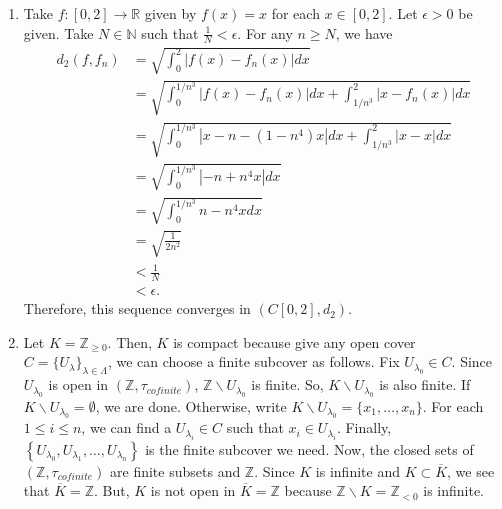 \documentclass{article}
\newcommand{\R}{\mathbb{R}}
\newcommand{\N}{\mathbb{N}}
\newcommand{\Z}{\mathbb{Z}}
\begin{document}
\begin{enumerate}[label=\roman*)]

\item Take $f:[0,2]\to \R$ given by $f(x)=x$ for each $x\in [0,2]$.
Let $\epsilon>0$ be given. Take $N\in\N$ such that $\frac{1}{N}<\epsilon$. 
For any $n\geq N$, we have 
\begin{align*}
    d_2(f,f_n) &= \sqrt{ \int_0^2 | f(x) - f_n(x) | dx } \\
    &= \sqrt{ \int_0^{1/n^3} | f(x) - f_n(x) | dx 
    + \int_{{1/n^3}}^2 | x - f_n(x) | dx } \\
    &= \sqrt{ \int_0^{1/n^3} | x - n - (1-n^4)x | dx 
    + \int_{{1/n^3}}^2 | x - x | dx } \\
    &= \sqrt{ \int_0^{1/n^3} | - n +n^4x | dx } \\
    &= \sqrt{ \int_0^{1/n^3} n-n^4x dx } \\
    &= \sqrt{\frac{1}{2n^2}} \\
    &<\frac{1}{N}\\&<\epsilon.
\end{align*}
Therefore, this sequence converges in $(C[0,2],d_2)$. 

\item Let $K=\Z_{\geq 0}$. Then, $K$ is compact because give any open cover 
$C = \{U_{\lambda}\}_{\lambda \in \Lambda}$, we can choose a finite subcover as follows. 
Fix $U_{\lambda_0} \in C$. Since $U_{\lambda_0}$ is open in $(\Z,\tau_{cofinite})$, 
$\Z \backslash U_{\lambda_0}$ is finite. So, $K \backslash U_{\lambda_0}$ is also finite. 
If $K \backslash U_{\lambda_0} = \emptyset$, we are done. Otherwise, write 
$K \backslash U_{\lambda_0} = \{x_1,\dots,x_n\}$. For each $1\leq i \leq n$, we can find a 
$U_{\lambda_i} \in C$ such that $x_i \in U_{\lambda_i}$. Finally, 
$\left\{U_{\lambda_0},U_{\lambda_1},\dots,U_{\lambda_n}\right\}$ is the finite subcover we need. 
Now, the closed sets of $(\Z,\tau_{cofinite})$ are finite subsets and $\Z$. Since $K$ is infinite 
and $K \subset \overline{K}$, we see that $\overline{K} = \Z$. But, $K$ is not open in 
$\overline{K}=\Z$ because $\Z \backslash K = \Z_{<0}$ is infinite.




\end{enumerate}
\end{document}
